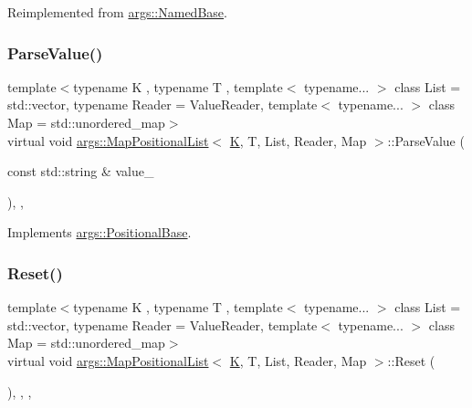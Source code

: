 Reimplemented from \hyperlink{classargs_1_1_named_base_a7e7bab5c0de59e717b87935b14376dfc}{args\+::\+Named\+Base}.

\mbox{\label{classargs_1_1_map_positional_list_ac2d042c42bc771954f340dc0a3b582c7}} 
\subsubsection{\texorpdfstring{Parse\+Value()}{ParseValue()}}
{\footnotesize\ttfamily template$<$typename K , typename T , template$<$ typename... $>$ class List = std\+::vector, typename Reader  = Value\+Reader, template$<$ typename... $>$ class Map = std\+::unordered\+\_\+map$>$ \\
virtual void \hyperlink{classargs_1_1_map_positional_list}{args\+::\+Map\+Positional\+List}$<$ \hyperlink{cgal__test_8cpp_a891e241aa245ae63618f03737efba309}{K}, T, List, Reader, Map $>$\+::Parse\+Value (\begin{DoxyParamCaption}\item[{const std\+::string \&}]{value\+\_\+ }\end{DoxyParamCaption})\hspace{0.3cm}{\ttfamily [inline]}, {\ttfamily [override]}, {\ttfamily [virtual]}}



Implements \hyperlink{classargs_1_1_positional_base_a10b6b91155f56bc28ca25fa87c6f0985}{args\+::\+Positional\+Base}.

\mbox{\label{classargs_1_1_map_positional_list_a69eefecdabf07a4fac7006acb2b144d3}} 
\subsubsection{\texorpdfstring{Reset()}{Reset()}}
{\footnotesize\ttfamily template$<$typename K , typename T , template$<$ typename... $>$ class List = std\+::vector, typename Reader  = Value\+Reader, template$<$ typename... $>$ class Map = std\+::unordered\+\_\+map$>$ \\
virtual void \hyperlink{classargs_1_1_map_positional_list}{args\+::\+Map\+Positional\+List}$<$ \hyperlink{cgal__test_8cpp_a891e241aa245ae63618f03737efba309}{K}, T, List, Reader, Map $>$\+::Reset (\begin{DoxyParamCaption}{ }\end{DoxyParamCaption})\hspace{0.3cm}{\ttfamily [inline]}, {\ttfamily [override]}, {\ttfamily [virtual]}, {\ttfamily [noexcept]}}



